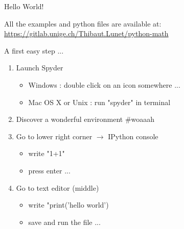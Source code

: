 \documentclass[11pt,unknownkeysallowed,usenames,dvipsnames]{beamer}
\begin{document}
	\begin{frame}{Hello World!}
        \begin{center}
            All the examples and python files are available at: \\
            \href{https://gitlab.unige.ch/Thibaut.Lunet/python-math}{https://gitlab.unige.ch/Thibaut.Lunet/python-math}
        \end{center}
        
        \begin{block}{A first easy step ...}
            \begin{enumerate}
                \item Launch Spyder
                \begin{itemize}
                    \item Windows : double click on an icon somewhere ...
                    \item Mac OS X or Unix : run "spyder" in terminal
                \end{itemize}
                \item Discover a wonderful environment \#woaaah
                \item Go to lower right corner $\rightarrow$ IPython console
                \begin{itemize}
                    \item write "1+1"
                    \item press enter ...
                \end{itemize}
                \item Go to text editor (middle)
                \begin{itemize}
                    \item write "print('hello world')
                    \item save and run the file ...
                \end{itemize}
            \end{enumerate}
        \end{block}
        
    \end{frame}
    
\end{document}
